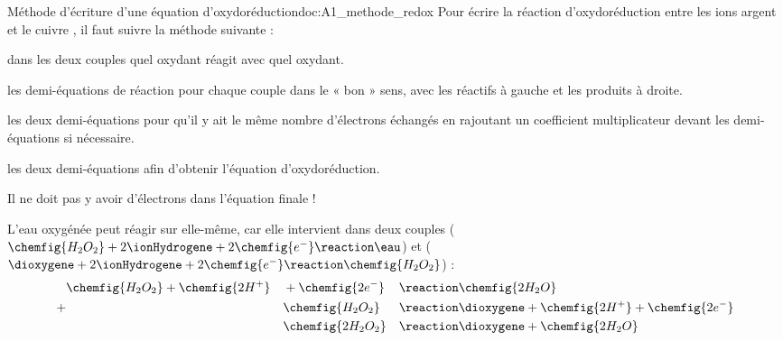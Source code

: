 

\begin{doc}{Méthode d'écriture d'une équation d'oxydoréduction}{doc:A1_methode_redox}
  Pour écrire la réaction d'oxydoréduction entre les ions argent \ionArgent et le cuivre , il faut suivre la méthode suivante :
  \begin{enumeration}
    \item {} dans les deux couples quel oxydant réagit avec quel oxydant.
    \item {} les demi-équations de réaction pour chaque couple dans le « bon » sens, avec les réactifs à gauche et les produits à droite.
    \item {} les deux demi-équations pour qu'il y ait le même nombre d'électrons échangés en rajoutant un coefficient multiplicateur devant les demi-équations si nécessaire. 
    \item {} les deux demi-équations afin d'obtenir l'équation d'oxydoréduction.
  \end{enumeration}
  \attention Il ne doit pas y avoir d'électrons dans l'équation finale !

  \exemple L'eau oxygénée peut réagir sur elle-même, car elle intervient dans deux couples 
  ($\chemfig{H_2O_2} + 2\ionHydrogene + 2\chemfig{e^{-}} \reaction \eau$) et
  ($\dioxygene + 2\ionHydrogene + 2\chemfig{e^{-}} \reaction \chemfig{H_2O_2}$) : 
  \begin{alignat*}{3}
     & \chemfig{H_2O_2} + \chemfig{2H^{+}} &&+ \chemfig{2e^{-}} &&\reaction \chemfig{2H_2O} \\
    +& &&\chemfig{H_2O_2}  &&\reaction \dioxygene + \chemfig{2H^{+}} + \chemfig{2e^{-}} \\
     & &&\chemfig{2H_2O_2} &&\reaction \dioxygene + \chemfig{2H_2O}
  \end{alignat*}
\end{doc}

